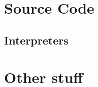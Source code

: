 \begin{appendices}
\lstset{style=appendix}
\makeatletter
{}
\makeatother
  \chapter{Source Code}
  \section{Interpreters}
  \label{app:interpreters}
  

  
  

  \chapter{Other stuff}

\end{appendices}

